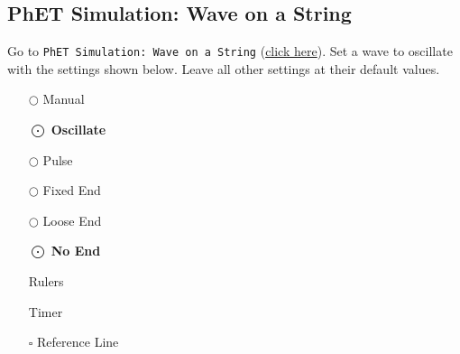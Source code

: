 \documentclass[]{exam}
\begin{document}
\subsection*{PhET Simulation: Wave on a String}


Go to \texttt{PhET Simulation: Wave on a String} (\href{https://phet.colorado.edu/sims/html/wave-on-a-string/latest/wave-on-a-string_all.html}{click here}). Set a wave to oscillate with the settings shown below. Leave all other settings at their default values.

\begin{center}
\begin{minipage}{0.15\textwidth}
\begin{itemize}
    \item[$\bigcirc$] Manual 
    \item[$\bigodot$] \textbf{Oscillate}
    \item[$\bigcirc$] Pulse
\end{itemize}
\end{minipage}%
\hspace{1ex}
\begin{minipage}{0.3\textwidth}
\centering
{}
\end{minipage}%
\hspace{1ex}
\begin{minipage}{0.15\textwidth}
\centering
\begin{itemize}
    \item[$\bigcirc$] Fixed End 
    \item[$\bigcirc$] Loose End
    \item[$\bigodot$] \textbf{No End}
\end{itemize}
\end{minipage}%
\hspace{1ex}
\begin{minipage}{0.2\textwidth}
\begin{itemize}
    \item[\checkbox{1}] Rulers
    \item[\checkbox{1}] Timer
    \item[$\square$] Reference Line
\end{itemize}
\end{minipage}
\end{center}
\end{document}
